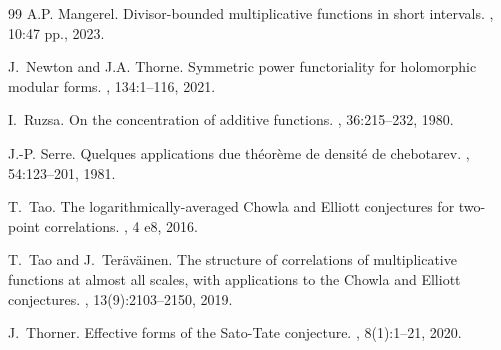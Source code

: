 \begin{thebibliography}{99}
A.P. Mangerel.
\newblock Divisor-bounded multiplicative functions in short intervals.
, 10:47 pp., 2023.

J.~Newton and J.A. Thorne.
\newblock Symmetric power functoriality for holomorphic modular forms.
, 134:1--116, 2021.

I.~Ruzsa.
\newblock On the concentration of additive functions.
, 36:215--232, 1980.

J.-P. Serre.
\newblock Quelques applications due th\'{e}or\`{e}me de densit\'{e} de
  chebotarev.
, 54:123--201, 1981.

T.~Tao.
\newblock The logarithmically-averaged {C}howla and {E}lliott conjectures for
  two-point correlations.
, 4 e8, 2016.

T.~Tao and J.~Ter\"{a}v\"{a}inen.
\newblock The structure of correlations of multiplicative functions at almost
  all scales, with applications to the {C}howla and {E}lliott conjectures.
, 13(9):2103--2150, 2019.

J.~Thorner.
\newblock Effective forms of the {S}ato-{T}ate conjecture.
, 8(1):1--21, 2020.

\end{thebibliography}
